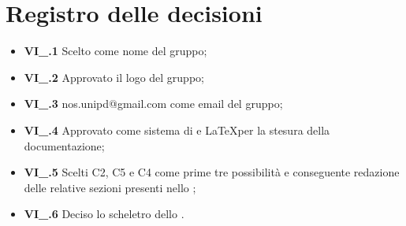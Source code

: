 \section{Registro delle decisioni}
\begin{itemize}
  \item \textbf{VI\_\Data.1} Scelto {\Gruppo} come nome del gruppo;
  \item \textbf{VI\_\Data.2} Approvato il logo del gruppo;
  \item \textbf{VI\_\Data.3} nos.unipd@gmail.com come email del gruppo;
  \item \textbf{VI\_\Data.4} Approvato  come sistema di  e \LaTeX per la stesura della documentazione;
  \item \textbf{VI\_\Data.5} Scelti  C2, C5 e C4 come prime tre possibilità e conseguente redazione delle relative sezioni presenti nello \textit{\SdF};
  \item \textbf{VI\_\Data.6} Deciso lo scheletro dello \SdF.
\end{itemize}
